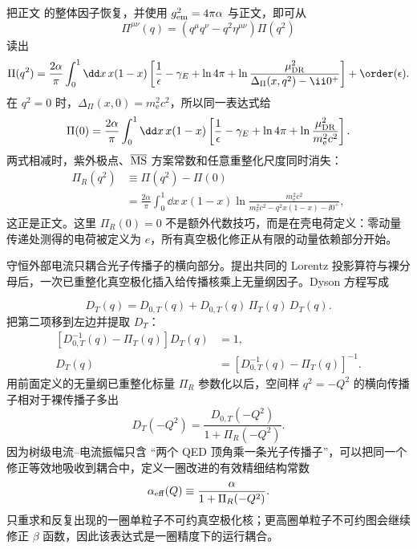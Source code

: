 \begin{derivation}
把正文 的整体因子恢复，并使用 $g_{\rm em}^2=4\pi\alpha$ 与正文，即可从
\[
\Pi^{\mu\nu}(q)
=(q^\mu q^\nu-q^2\eta^{\mu\nu})\Pi(q^2)
\]
读出
\begin{align*}
\Pi(q^2)
=\frac{2\alpha}{\pi}
\int_0^1\dd x\,x(1-x)
\left[
\frac1\epsilon-\gamma_E+\ln4\pi
+\ln\frac{\mu_{\rm DR}^2}
{\Delta_\Pi(x,q^2)-\ii0^+}
\right]
+\order(\epsilon).
\end{align*}
在 $q^2=0$ 时，$\Delta_\Pi(x,0)=m_{\mathrm e}^2c^2$，所以同一表达式给
\begin{align*}
\Pi(0)
=\frac{2\alpha}{\pi}
\int_0^1\dd x\,x(1-x)
\left[
\frac1\epsilon-\gamma_E+\ln4\pi
+\ln\frac{\mu_{\rm DR}^2}{m_{\mathrm e}^2c^2}
\right].
\end{align*}
两式相减时，紫外极点、$\overline{\rm MS}$ 方案常数和任意重整化尺度同时消失：
\begin{align*}
\Pi_R(q^2)
&\equiv\Pi(q^2)-\Pi(0)\\
&=\frac{2\alpha}{\pi}
\int_0^1\dd x\,x(1-x)
\ln\frac{m_{\mathrm e}^2c^2}
{m_{\mathrm e}^2c^2-q^2x(1-x)-\ii0^+},
\end{align*}
这正是正文。这里 $\Pi_R(0)=0$ 不是额外代数技巧，而是在壳电荷定义：零动量传递处测得的电荷被定义为 $e$，所有真空极化修正从有限的动量依赖部分开始。
\end{derivation}

\begin{derivation}[真空极化插入与有效电荷]
守恒外部电流只耦合光子传播子的横向部分。提出共同的 Lorentz 投影算符与裸分母后，一次已重整化真空极化插入给传播核乘上无量纲因子。Dyson 方程写成

\begin{equation*}
 D_T(q)=D_{0,T}(q)+D_{0,T}(q)\,\Pi_T(q)\,D_T(q).
 \end{equation*}
把第二项移到左边并提取 $D_T$：
\begin{align*}
 \left[D_{0,T}^{-1}(q)-\Pi_T(q)\right]D_T(q)&=1,\\
 D_T(q)&=\left[D_{0,T}^{-1}(q)-\Pi_T(q)\right]^{-1}.
\end{align*}
用前面定义的无量纲已重整化标量 $\Pi_R$ 参数化以后，空间样 $q^2=-Q^2$ 的横向传播子相对于裸传播子多出
\begin{equation*}
 {
 D_T(-Q^2)=\frac{D_{0,T}(-Q^2)}{1+\Pi_R(-Q^2)}.}
 \end{equation*}
因为树级电流--电流振幅只含 ``两个 QED 顶角乘一条光子传播子''，可以把同一个修正等效地吸收到耦合中，定义一圈改进的有效精细结构常数
\begin{equation*}
 {
 \alpha_{\rm eff}(Q)
 \equiv
 \frac{\alpha}{1+\Pi_R(-Q^2)}.}
 \end{equation*}
 只重求和反复出现的一圈单粒子不可约真空极化核；更高圈单粒子不可约图会继续修正 $\beta$ 函数，因此该表达式是一圈精度下的运行耦合。
\end{derivation}

